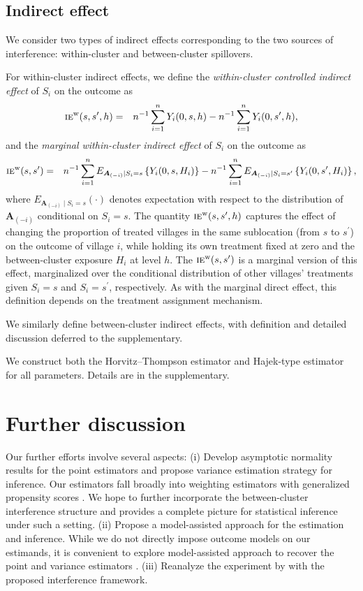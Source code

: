 \documentclass{article}
\newcommand{\bA}{\boldsymbol{A}}
\newcommand{\sumi}{\sum_{i=1}^n}
\newcommand{\ie}{\textsc{ie}}
\begin{document}
\subsection{Indirect effect}
We consider two types of indirect effects corresponding to the two sources of interference: within-cluster and between-cluster spillovers.

For within-cluster indirect effects, we define the \textit{within-cluster controlled indirect effect} of $S_{i}$ on the outcome as
\begin{eqnarray*}
    \ie^{\textup{w}}(s,s^{\prime},h) &=& n^{-1}\sumi Y_{i}(0,s,h) - n^{-1}\sumi Y_{i}(0,s^{\prime},h),
\end{eqnarray*}
and the \textit{marginal within-cluster indirect effect} of $S_{i}$ on the outcome as
\begin{eqnarray*}
    \ie^{\textup{w}}(s,s^{\prime}) &=& n^{-1}\sumi E_{\bA_{(-i)}\mid S_{i} = s}\left\{Y_{i}(0,s,H_{i})\right\} - n^{-1}\sumi E_{\bA_{(-i)}\mid S_{i} = s^{\prime}}\left\{Y_{i}(0,s^{\prime},H_{i})\right\},
\end{eqnarray*}
where $E_{\bA_{(-i)}\mid S_{i} = s}(\cdot)$ denotes expectation with respect to the distribution of $\bA_{(-i)}$ conditional on $S_{i}=s$. The quantity $\ie^{\textup{w}}(s,s^{\prime},h)$ captures the effect of changing the proportion of treated villages in the same sublocation (from $s$ to $s^{\prime}$) on the outcome of village $i$, while holding its own treatment fixed at zero and the between-cluster exposure $H_{i}$ at level $h$. The $\ie^{\textup{w}}(s,s^{\prime})$ is a marginal version of this effect, marginalized over the conditional distribution of other villages' treatments given $S_{i}=s$ and $S_{i}=s^{\prime}$, respectively. As with the marginal direct effect, this definition depends on the treatment assignment mechanism.

We similarly define between-cluster indirect effects, with definition and detailed discussion deferred to the supplementary.

We construct both the Horvitz--Thompson estimator and Hajek-type estimator for all parameters. Details are in the supplementary.
      
\section{Further discussion}     
Our further efforts involve several aspects: (i) Develop asymptotic normality results for the point estimators and propose variance estimation strategy for inference. Our estimators fall broadly into weighting estimators with generalized propensity scores \citep{imbens2000role, aronow2017estimating}. We hope to further incorporate the between-cluster interference structure and provides a complete picture for statistical inference under such a setting. (ii) Propose a model-assisted approach for the estimation and inference. While we do not directly impose outcome models on our estimands, it is convenient to explore model-assisted approach to recover the point and variance estimators \citep{zhao2022reconciling}. (iii) Reanalyze the experiment by \cite{egger2022general} with the proposed interference framework. 
\end{document}
